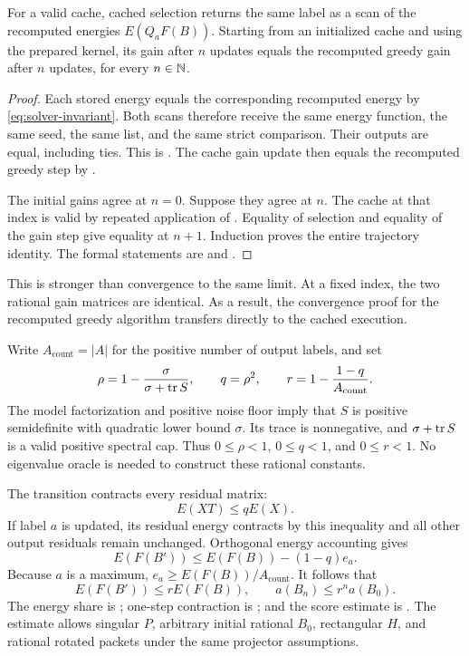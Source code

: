 \begin{proposition}
For a valid cache, cached selection returns the same label as a scan of the
recomputed energies $E(Q_aF(B))$. Starting from an initialized cache and using the
prepared kernel, its gain after $n$ updates equals the recomputed greedy gain after
$n$ updates, for every $n\in\mathbb N$.
\end{proposition}
\begin{proof}
Each stored energy equals the corresponding recomputed energy by
\eqref{eq:solver-invariant}. Both scans therefore receive the same energy
function, the same seed, the same list, and the same strict comparison. Their
outputs are equal, including ties. This is . The cache gain update
then equals the recomputed greedy step by .

The initial gains agree at $n=0$. Suppose they agree at $n$. The cache at that
index is valid by repeated application of . Equality of
selection and equality of the gain step give equality at $n+1$. Induction proves
the entire trajectory identity. The formal statements are
 and .
\end{proof}

This is stronger than convergence to the same limit. At a fixed index, the two
rational gain matrices are identical. As a result, the convergence proof for the
recomputed greedy algorithm transfers directly to the cached execution.

Write $A_{\mathrm{count}}=|A|$ for the positive number of output labels, and set
\begin{equation}
 \rho=1-\frac{\sigma}{\sigma+\operatorname{tr} S},\qquad
 q=\rho^2,\qquad r=1-\frac{1-q}{A_{\mathrm{count}}}.
 \label{eq:solver-rates}
\end{equation}
The model factorization and positive noise floor imply that $S$ is positive
semidefinite with quadratic lower bound $\sigma$. Its trace is nonnegative, and
$\sigma+\operatorname{tr} S$ is a valid positive spectral cap. Thus $0\le\rho<1$, $0\le q<1$,
and $0\le r<1$. No eigenvalue oracle is needed to construct these rational
constants.

The transition contracts every residual matrix:
\[
 E(XT)\le qE(X).
\]
If label $a$ is updated, its residual energy contracts by this inequality and
all other output residuals remain unchanged. Orthogonal energy accounting gives
\[
 E(F(B'))\le E(F(B))-(1-q)e_a.
\]
Because $a$ is a maximum, $e_a\ge E(F(B))/A_{\mathrm{count}}$. It follows that
\begin{equation}
 E(F(B'))\le rE(F(B)),\qquad
 a(B_n)\le r^na(B_0).
 \label{eq:solver-geometric}
\end{equation}
The energy share is ; one-step contraction is
; and the score estimate is
. The estimate allows singular $P$, arbitrary initial
rational $B_0$, rectangular $H$, and rational rotated packets under the same
projector assumptions.

